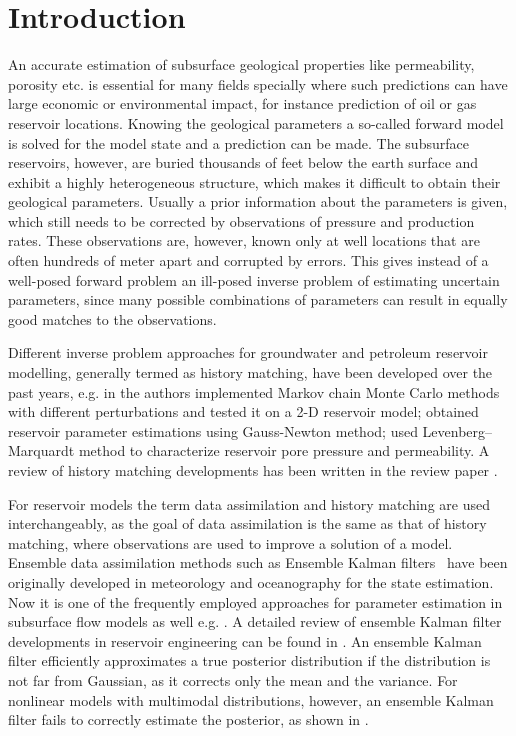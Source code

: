 \documentclass[12, a4paper]{article}
\numberwithin{equation}{section}
\begin{document}
	\maketitle
	
	\section{Introduction}
		
An accurate estimation of subsurface geological properties like permeability, porosity etc. is essential for many fields specially where such predictions can have large economic or environmental impact, for instance prediction of oil or gas reservoir locations. Knowing the geological parameters a so-called forward model is solved for the model state and a prediction can be made. The subsurface reservoirs, however, are buried thousands of feet below the earth surface and exhibit a highly heterogeneous structure, which makes it difficult to obtain their geological parameters. Usually a prior information about the parameters is given, which still needs to be corrected by observations of pressure and production rates. These observations  are, however,  known only at well locations that are often hundreds of meter apart and corrupted by errors. This gives instead of  a well-posed forward problem an ill-posed inverse problem of estimating uncertain parameters, since many possible combinations of parameters can result in equally good matches to the observations. 

Different inverse problem approaches for groundwater and petroleum reservoir modelling, generally termed as history matching, have been developed over the past years, e.g. in \cite{Oletal97} the authors implemented Markov chain Monte Carlo methods with different perturbations and tested it on a 2-D reservoir model; \cite{Reetal96} obtained reservoir parameter estimations using Gauss-Newton method; \cite{Veetal06} used Levenberg--Marquardt method to characterize reservoir pore pressure and permeability. A review of history matching developments has been written in the review paper \cite{OlCh11}.

For reservoir models the term data assimilation and history matching are used interchangeably, as the goal of  data assimilation is the same as that of history matching, where observations are used to improve  a solution of a model. Ensemble data assimilation methods such as Ensemble Kalman filters~\cite{Evensen09} have been originally developed in meteorology and oceanography for the state estimation. Now it is one of the frequently employed approaches for parameter estimation in subsurface flow models as well e.g. \cite{Oletal08}. A detailed review of ensemble Kalman filter developments in reservoir engineering can be found in \cite{Aaetal09}.  An ensemble Kalman filter efficiently approximates a true posterior distribution if the distribution is not far from Gaussian, as it corrects only the mean and the variance. For nonlinear models with multimodal distributions, however, an ensemble Kalman filter fails to correctly estimate the posterior, as shown in \cite{DoDR11}.
\end{document}
